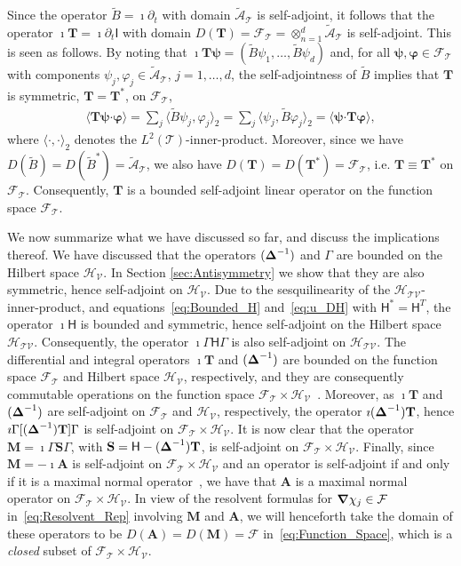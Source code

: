 \documentclass[leqno,onefignum,onetabnum]{siamltex1213}
\newcommand{\Mb}{\mathbf{M}}
\newcommand{\Tb}{\mathbf{T}}
\newcommand{\Sb}{\mathbf{S}}
\newcommand{\Ab}{\mathbf{A}}
\newcommand{\Tc}{\mathcal{T}}
\newcommand{\Vc}{\mathcal{V}}
\newcommand{\Hc}{\mathcal{H}}
\newcommand{\Fc}{\mathcal{F}}
\newcommand{\Hm}{\mathsf{H}}
\newcommand{\Ib}{\mathsf{I}}
\newcommand{\As}{\mathscr{A}}
\newcommand\bDelta{\mbox{\boldmath${\Delta}$}}
\newcommand\bnabla{\mbox{\boldmath${\nabla}$}}
\providecommand\bcdot{\boldsymbol{\cdot}}
\newcommand{\vecpsi}{\boldsymbol{\psi}}
\newcommand{\vecvarphi}{\boldsymbol{\varphi}}
\begin{document}
Since the operator $\tilde{B}=\imath\partial_t$ with domain $\tilde{\As}_{\Tc}$ is
self-adjoint, it follows that the operator $\imath\Tb=\imath\partial_t\Ib$ with domain
$D(\Tb)=\Fc_{\Tc}=\otimes_{n=1}^d\tilde{\As}_{\Tc}$ is self-adjoint. This is
seen as follows. By noting that
$\imath\Tb\vecpsi=(\tilde{B}\psi_1,\ldots,\tilde{B}\psi_d)$ and, for all 
$\vecpsi,\vecvarphi\in\Fc_{\Tc}$ with components
$\psi_j,\varphi_j\in\tilde{\As}_{\Tc}$, $j=1,\ldots,d$, the self-adjointness of 
$\tilde{B}$ implies that $\Tb$ is symmetric, $\Tb=\Tb^*$, on $\Fc_{\Tc}$, 
%
\begin{align}\label{eq:T_symmetric}
  \langle\Tb\vecpsi\bcdot\vecvarphi\rangle=\sum_j\langle\tilde{B}\psi_j,\varphi_j\rangle_2
                    =\sum_j\langle\psi_j,\tilde{B}\varphi_j\rangle_2
                    =\langle\vecpsi\bcdot\Tb\vecvarphi\rangle,
\end{align}
%
where $\langle\cdot,\cdot\rangle_2$ denotes the $L^2(\Tc)$-inner-product.  Moreover, since we have
$D(\tilde{B})=D(\tilde{B}^*)=\tilde{\As}_{\Tc}$, we also have
$D(\Tb)=D(\Tb^*)=\Fc_{\Tc}$, i.e. $\Tb\equiv\Tb^*$ on
$\Fc_{\Tc}$. Consequently, $\Tb$ is a bounded self-adjoint linear
operator on the function space $\Fc_{\Tc}$.



We now summarize what we have discussed so far, and
discuss the implications thereof. We have discussed that the 
operators $(\bDelta^{-1})$ and $\Gamma$ are bounded on the Hilbert
space $\Hc_{\Vc}$. In Section \ref{sec:Antisymmetry} we show
that they are also symmetric, hence self-adjoint on $\Hc_{\Vc}$. Due
to the sesquilinearity of the $\Hc_{\Tc\Vc}$-inner-product, and
equations~\eqref{eq:Bounded_H} and~\eqref{eq:u_DH} with $\Hm^*=\Hm^T$,
the  operator $\imath\Hm$ is bounded and symmetric, hence self-adjoint on
the Hilbert space $\Hc_{\Tc\Vc}$.  Consequently, the operator
$\imath\Gamma\Hm\Gamma$ is also self-adjoint on $\Hc_{\Tc\Vc}$. The
differential and integral operators $\imath\Tb$ and $(\bDelta^{-1})$ are 
bounded on the function space $\Fc_{\Tc}$ and Hilbert space $\Hc_{\Vc}$,
respectively, and they are consequently commutable operations on the
function space $\Fc_{\Tc}\times\Hc_{\Vc}$~\cite{Folland:99}. Moreover, as
$\imath\Tb$ and $(\bDelta^{-1})$ are self-adjoint on
$\Fc_{\Tc}$ and $\Hc_{\Vc}$, respectively, the operator 
$\imath(\bDelta^{-1})\Tb$, hence $\imath\Gamma[(\bDelta^{-1})\Tb]\Gamma$ is
self-adjoint on $\Fc_{\Tc}\times\Hc_{\Vc}$. It is now clear that the operator
$\Mb=\imath\Gamma\Sb\Gamma$, with $\Sb=\Hm-(\bDelta^{-1})\Tb$, is
self-adjoint on $\Fc_{\Tc}\times\Hc_{\Vc}$. Finally, since $\Mb=-\imath\Ab$ is
self-adjoint on $\Fc_{\Tc}\times\Hc_{\Vc}$ and an operator is
self-adjoint if and only if it is a maximal normal
operator~\cite{Stone:64}, we have that $\Ab$ is a maximal normal 
operator on $\Fc_{\Tc}\times\Hc_{\Vc}$. In view of the resolvent
formulas for $\bnabla \chi_j\in\Fc$ in~\eqref{eq:Resolvent_Rep}
involving $\Mb$ and $\Ab$, we will henceforth take the domain of
these operators to be $D(\Ab)=D(\Mb)=\Fc$
in~\eqref{eq:Function_Space}, which is a \emph{closed} subset of 
$\Fc_{\Tc}\times\Hc_{\Vc}$.   
\end{document}
